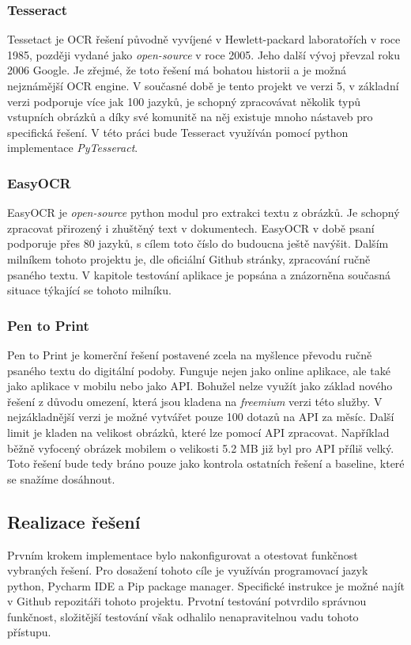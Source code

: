 \documentclass[journal]{IEEEtran}
\begin{document}
\subsubsection{Tesseract}
Tessetact je \ac{OCR} řešení původně vyvíjené v Hewlett-packard laboratořích v roce 1985, později vydané jako \textit{open-source} v roce 2005.
Jeho další vývoj převzal roku 2006 Google.
Je zřejmé, že toto řešení má bohatou historii a je možná nejznámější \ac{OCR} engine.
V současné době je tento projekt ve verzi 5, v základní verzi podporuje více jak 100 jazyků, je schopný zpracovávat několik typů vstupních obrázků a díky své komunitě na něj existuje mnoho nástaveb pro specifická řešení.
V této práci bude Tesseract využíván pomocí python implementace \textit{PyTesseract}.

\subsubsection{EasyOCR}
EasyOCR je \textit{open-source} python modul pro extrakci textu z obrázků.
Je schopný zpracovat přirozený i zhuštěný text v dokumentech.
EasyOCR v době psaní podporuje přes 80 jazyků, s cílem toto číslo do budoucna ještě navýšit.
Dalším milníkem tohoto projektu je, dle oficiální Github stránky, zpracování ručně psaného textu.
V kapitole testování aplikace je popsána a znázorněna současná situace týkající se tohoto milníku.\cite{easy_ocr}

\subsubsection{Pen to Print}
Pen to Print je komerční řešení postavené zcela na myšlence převodu ručně psaného textu do digitální podoby.
Funguje nejen jako online aplikace, ale také jako aplikace v mobilu nebo jako \ac{API}.
Bohužel nelze využít jako základ nového řešení z důvodu omezení, která jsou kladena na \textit{freemium} verzi této služby.
V nejzákladnější verzi je možné vytvářet pouze 100 dotazů na \ac{API} za měsíc.
Další limit je kladen na velikost obrázků, které lze pomocí \ac{API} zpracovat.
Například běžně vyfocený obrázek mobilem o velikosti 5.2 MB již byl pro \ac{API} příliš velký.
Toto řešení bude tedy bráno pouze jako kontrola ostatních řešení a baseline, které se snažíme dosáhnout.
%
\subsection{Realizace řešení}
Prvním krokem implementace bylo nakonfigurovat a otestovat funkčnost vybraných řešení.
Pro dosažení tohoto cíle je využíván programovací jazyk python, Pycharm \ac{IDE} a Pip package manager.
Specifické instrukce je možné najít v Github repozitáři tohoto projektu.
Prvotní testování potvrdilo správnou funkčnost, složitější testování však odhalilo nenapravitelnou vadu tohoto přístupu.
\end{document}
